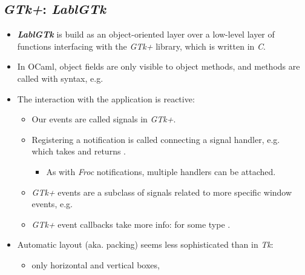 \documentclass{beamer}
\newcommand{\tmem}[1]{{\em #1\/}}
\newcommand{\tmstrong}[1]{\textbf{#1}}
\newcommand{\tmverbatim}[1]{\text{{\ttfamily{#1}}}}
\begin{document}
\subsection{{\tmem{GTk+}}: {\tmem{LablGTk}}}

\begin{itemize}
  \item {\tmstrong{{\tmem{LablGTk}}}} is build as an object-oriented layer
  over a low-level layer of functions interfacing with the {\tmem{GTk+}}
  library, which is written in {\tmem{C}}.
  
  \item In OCaml, object fields are only visible to object methods, and
  methods are called with {\hlopt{\#}} syntax, e.g. {}{\hlopt{()}}
  
  \item The interaction with the application is reactive:
  \begin{itemize}
    \item Our events are called signals in {\tmem{GTk+}}.
    
    \item Registering a notification is called connecting a signal handler,
    e.g.\\
    {}{\hlopt{:}}{} which takes {}{\hlopt{:(}}{}{\hlopt{->
    }}{}{\hlopt{)}} and returns
    {}{}{}.
    \begin{itemize}
      \item As with {\tmem{Froc}} notifications, multiple handlers can be
      attached.
    \end{itemize}
    \item {\tmem{GTk+}} events are a subclass of signals related to more
    specific window events, e.g.\\
    {}{\hlopt{:}}{}
    
    \item {\tmem{GTk+}} event callbacks take more info:
    {}{\hlopt{:(}}{}{\hlopt{->
    }}{}{\hlopt{)}} for some type \tmverbatim{event}.
  \end{itemize}
  \item Automatic layout (aka. packing) seems less sophisticated than in
  {\tmem{Tk}}:
  \begin{itemize}
    \item only horizontal and vertical boxes,
    

\end{itemize}
\end{itemize}
\end{document}
